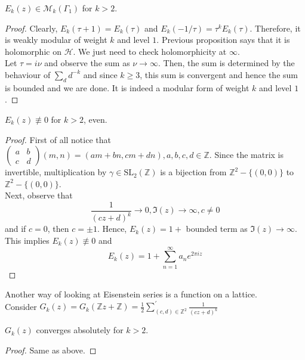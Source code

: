 \documentclass[oneside, 12pt]{scrbook}
\newcommand{\ZZ}{\mathbb Z}
\newcommand{\SL}{\mathrm{SL}}
\newcommand{\Hh}{\mathcal{H}}
\newcommand{\Mm}{\mathcal{M}}
\theoremstyle{theorem}
\begin{document}
\begin{theorem}[DS, Exercise 1.1.4]
$E_{k}(z) \in \Mm_{k}(\Gamma_{1})$ for $k >2$.
\end{theorem}

\begin{proof}
Clearly, $E_{k}(\tau +1) = E_{k}(\tau)$ and $E_{k}(-1/\tau) = \tau^k E_{k}(\tau)$. Therefore, it is weakly modular of weight $k$ and level $1$. Previous proposition says that it is holomorphic on $\Hh$. We just need to check holomorphicity at $\infty$. \\
Let $\tau = i \nu$ and observe the sum as $\nu \rightarrow \infty$. Then, the sum is determined by the behaviour of $\sum_{d}d^{-k}$ and since $k\geq 3$, this sum is convergent and hence the sum is bounded and we are done. It is indeed a modular form of weight $k$ and level $1$.
\end{proof}

\begin{proposition}
$E_{k}(z) \not \equiv 0$ for $k>2$, even.
\end{proposition}

\begin{proof}
First of all notice  that $\begin{pmatrix}
a & b \\ c & d
\end{pmatrix} (m,n) = (am + bn,cm+dn) , a,b,c,d \in \ZZ$. Since the matrix is invertible, multiplication by $\gamma \in \SL_{2}(\ZZ)$ is a bijection from $\ZZ^2 - \{(0,0)\}$ to $\ZZ^2 - \{(0,0)\}$. \\

Next, observe that $$\frac{1}{(cz+d)^k} \rightarrow 0 , \mathfrak{I}(z) \rightarrow \infty , c\neq 0$$ and if $c = 0$, then $c=\pm 1$. Hence, $E_{k}(z) = 1 +$ bounded term as $\mathfrak{I}(z) \rightarrow \infty$. This implies $E_{k}(z) \not \equiv 0$ and $$E_{k}(z) = 1 + \sum_{n=1}^{\infty} a_{n}e^{2 \pi i z}$$
\end{proof}

Another way of looking at Eisenstein series is a function on a lattice. \\
Consider $G_{k}(z) = G_{k}(\ZZ z + \ZZ) = \frac{1}{2} \sum_{(c,d) \in \ZZ^2}^{'} \frac{1}{(cz+d)^k}$

\begin{proposition}
$G_{k}(z)$ converges absolutely for $k>2$.
\end{proposition} 

\begin{proof}
Same as above.
\end{proof}
\end{document}
